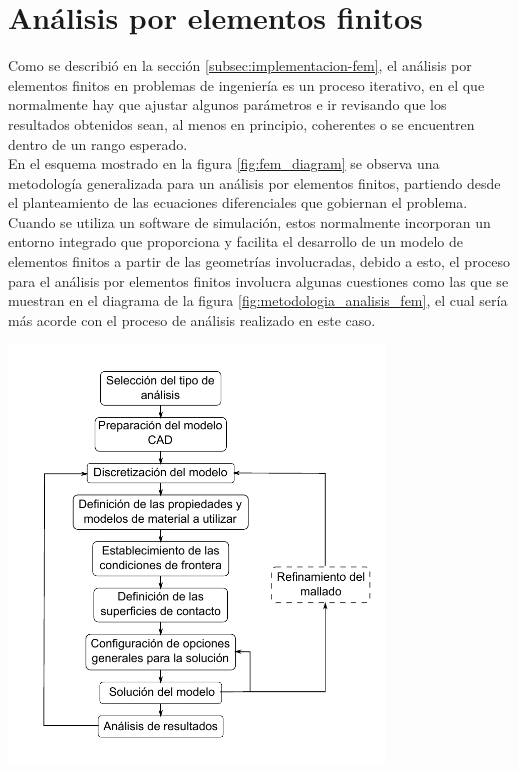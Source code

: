 \section{Análisis por elementos finitos}\label{sec:fea}

Como se describió en la sección \ref{subsec:implementacion-fem}, el análisis por elementos 
finitos en problemas de ingeniería es un proceso iterativo, en el que normalmente hay que ajustar 
algunos parámetros e ir revisando que los resultados obtenidos sean, al menos en principio, 
coherentes o se encuentren dentro de un rango esperado. \\

En el esquema mostrado en la figura \ref{fig:fem_diagram} se observa una metodología generalizada 
para un análisis por elementos finitos, partiendo desde el planteamiento de las 
ecuaciones diferenciales que gobiernan el problema. Cuando se utiliza un software 
de simulación, estos normalmente incorporan un entorno integrado que 
proporciona y facilita el desarrollo de un modelo de elementos finitos a partir 
de las geometrías involucradas, debido a esto, el proceso para el análisis por elementos 
finitos involucra algunas cuestiones como las que se muestran en el diagrama de 
la figura \ref{fig:metodologia_analisis_fem}, el cual sería más acorde con 
el proceso de análisis realizado en este caso.

\begin{center}
\includegraphics[width=0.75\textwidth]{src/ch3/metodologia_analisis_fem.pdf}
\label{fig:metodologia_analisis_fem}
\end{center}

